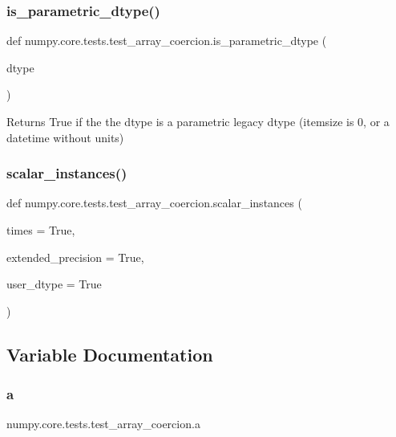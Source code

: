 \subsubsection{\texorpdfstring{is\+\_\+parametric\+\_\+dtype()}{is\_parametric\_dtype()}}
{\footnotesize\ttfamily def numpy.\+core.\+tests.\+test\+\_\+array\+\_\+coercion.\+is\+\_\+parametric\+\_\+dtype (\begin{DoxyParamCaption}\item[{}]{dtype }\end{DoxyParamCaption})}

\begin{DoxyVerb}Returns True if the the dtype is a parametric legacy dtype (itemsize
is 0, or a datetime without units)
\end{DoxyVerb}
 \mbox{\label{namespacenumpy_1_1core_1_1tests_1_1test__array__coercion_a05348eea13c6dd9f83e3781464ecb484}} 
\subsubsection{\texorpdfstring{scalar\+\_\+instances()}{scalar\_instances()}}
{\footnotesize\ttfamily def numpy.\+core.\+tests.\+test\+\_\+array\+\_\+coercion.\+scalar\+\_\+instances (\begin{DoxyParamCaption}\item[{}]{times = {\ttfamily True},  }\item[{}]{extended\+\_\+precision = {\ttfamily True},  }\item[{}]{user\+\_\+dtype = {\ttfamily True} }\end{DoxyParamCaption})}



\subsection{Variable Documentation}
\mbox{\label{namespacenumpy_1_1core_1_1tests_1_1test__array__coercion_af7280b4e939b2b2de78d9579223fab50}} 
\subsubsection{\texorpdfstring{a}{a}}
{\footnotesize\ttfamily numpy.\+core.\+tests.\+test\+\_\+array\+\_\+coercion.\+a}

